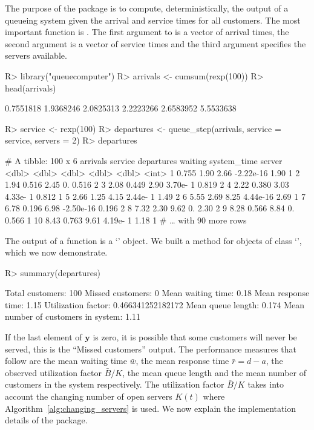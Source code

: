 \documentclass[article]{jss}
\begin{document}
The purpose of the package  is to compute, deterministically, the output of a queueing system given the arrival and service times for all customers. The most important function is . The first argument to   is a vector of arrival times, the second argument is a vector of service times and the third argument specifies the servers available. 
%
\begin{CodeChunk}
\begin{Sinput}
R> library("queuecomputer")
R> arrivals <- cumsum(rexp(100))
R> head(arrivals)
\end{Sinput}
\begin{Soutput}
[1] 0.7551818 1.9368246 2.0825313 2.2223266 2.6583952 5.5533638
\end{Soutput}
\begin{Sinput}
R> service <- rexp(100)
R> departures <- queue_step(arrivals, service = service, servers = 2)
R> departures
\end{Sinput}
\begin{Soutput}
# A tibble: 100 x 6
arrivals service departures   waiting system_time server
<dbl>   <dbl>      <dbl>     <dbl>       <dbl>  <int>
1    0.755   1.90        2.66 -2.22e-16       1.90       1
2    1.94    0.516       2.45  0.             0.516      2
3    2.08    0.449       2.90  3.70e- 1       0.819      2
4    2.22    0.380       3.03  4.33e- 1       0.812      1
5    2.66    1.25        4.15  2.44e- 1       1.49       2
6    5.55    2.69        8.25  4.44e-16       2.69       1
7    6.78    0.196       6.98 -2.50e-16       0.196      2
8    7.32    2.30        9.62  0.             2.30       2
9    8.28    0.566       8.84  0.             0.566      1
10    8.43    0.763       9.61  4.19e- 1       1.18       1
# … with 90 more rows
\end{Soutput}
\end{CodeChunk}
%
The output of a  function is a `'
object. We built a  method for objects of class
`', which we now demonstrate.
%
\begin{CodeChunk}
\begin{Sinput}
R> summary(departures)
\end{Sinput}
\begin{Soutput}
Total customers:
100
Missed customers:
0
Mean waiting time:
0.18
Mean response time:
1.15
Utilization factor:
0.466341252182172
Mean queue length:
0.174
Mean number of customers in system:
1.11
\end{Soutput}
\end{CodeChunk}
%
If the last element of $\mathbf{y}$ is zero, it is possible that some
customers will never be served, this is the ``Missed customers''
output. The performance measures that follow are the mean waiting time
$\bar{w}$, the mean response time $\bar{r} = d - a$, the observed
utilization factor $\bar{B}/K$, the mean queue length and the mean
number of customers in the system respectively. The utilization factor
$\bar{B}/K$ takes into account the changing number of open servers
$K(t)$ where Algorithm~\ref{alg:changing_servers} is used. We now
explain the implementation details of the package.
\end{document}
